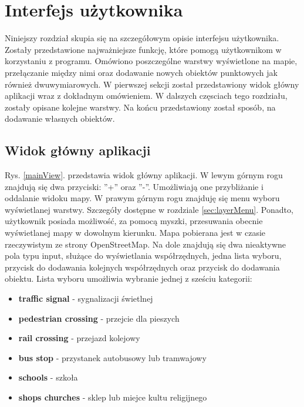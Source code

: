 \chapter{Interfejs użytkownika}
\label{cha:UI}
Niniejszy rozdział skupia się na szczegółowym opisie interfejsu użytkownika. Zostały przedstawione najważniejsze funkcję, które pomogą użytkownikom w korzystaniu z programu. Omówiono poszczególne warstwy wyświetlone na mapie, przełączanie między nimi oraz dodawanie nowych obiektów punktowych jak również dwuwymiarowych.
W pierwszej sekcji został przedstawiony widok główny aplikacji wraz z dokładnym omówieniem. W dalszych częsciach tego rozdziału, zostały opisane kolejne warstwy. Na końcu przedstawiony został sposób, na dodawanie własnych obiektów.
\section{Widok główny aplikacji}
\label{sec:mainView}

Rys. \ref{mainView}. przedstawia widok główny aplikacji. W lewym górnym rogu znajdują się dwa przyciski: ''+'' oraz ''-''. Umożliwiają one przybliżanie i oddalanie widoku mapy. W prawym górnym rogu znajduję się menu wyboru wyświetlanej warstwy. Szczegóły dostępne w rozdziale \ref{sec:layerMenu}. Ponadto, użytkownik posiada możliwość, za pomocą myszki, przesuwania obecnie wyświetlanej mapy w dowolnym kierunku. Mapa pobierana jest w czasie rzeczywistym ze strony OpenStreetMap. Na dole znajdują się dwa nieaktywne pola typu input, służące do wyświetlania współrzędnych, jedna lista wyboru, przycisk do dodawania kolejnych współrzędnych oraz przycisk do dodawania obiektu. Lista wyboru umożliwia wybranie jednej z sześciu kategorii:
\begin{itemize}
\item \textbf{traffic signal} - sygnalizacji świetlnej
\item \textbf{pedestrian crossing} - przejcie dla pieszych
\item \textbf{rail crossing} - przejazd kolejowy
\item \textbf{bus stop} - przystanek autobusowy lub tramwajowy
\item \textbf{schools} - szkoła
\item \textbf{shops churches} - sklep lub miejce kultu religijnego
\end{itemize}

